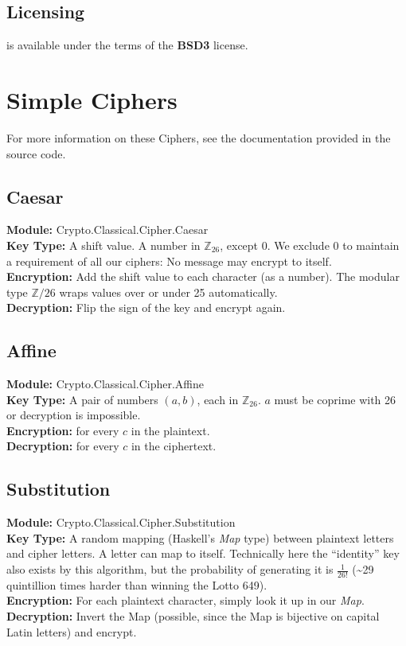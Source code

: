 \documentclass{article}
\begin{document}
\subsection{Licensing}
 is available under the terms of the \textbf{BSD3}
license.


\section{Simple Ciphers}
For more information on these Ciphers, see the documentation provided
in the source code.

\subsection{Caesar}
\textbf{Module:} Crypto.Classical.Cipher.Caesar\\
\textbf{Key Type:} A shift value.
A number in $\mathbb{Z}_{26}$, except 0. We exclude
0 to maintain a requirement of all our ciphers: No message may encrypt
to itself.\\
\textbf{Encryption:} Add the shift value to each character (as a number).
The modular type $\mathbb{Z}/26$ wraps values over or under 25 automatically.\\
\textbf{Decryption:} Flip the sign of the key and encrypt again.

\subsection{Affine}
\textbf{Module:} Crypto.Classical.Cipher.Affine\\
\textbf{Key Type:} A pair of numbers $(a,b)$, each in $\mathbb{Z}_{26}$. $a$
must be coprime with 26 or decryption is impossible.\\
\textbf{Encryption:}  for every $c$ in the plaintext.\\
\textbf{Decryption:}  for every $c$
in the ciphertext.

\subsection{Substitution}
\textbf{Module:} Crypto.Classical.Cipher.Substitution\\
\textbf{Key Type:} A random mapping (Haskell's \emph{Map} type) between
plaintext letters and cipher letters. A letter can map to itself.
Technically here the ``identity'' key also exists by this algorithm,
but the probability
of generating it is $\frac{1}{26!}$ (\~{}29 quintillion times harder than
winning the Lotto 649).\\
\textbf{Encryption:} For each plaintext character, simply look it up
in our \emph{Map}.\\
\textbf{Decryption:} Invert the Map (possible, since the Map is bijective
on capital Latin letters) and encrypt.
\end{document}
